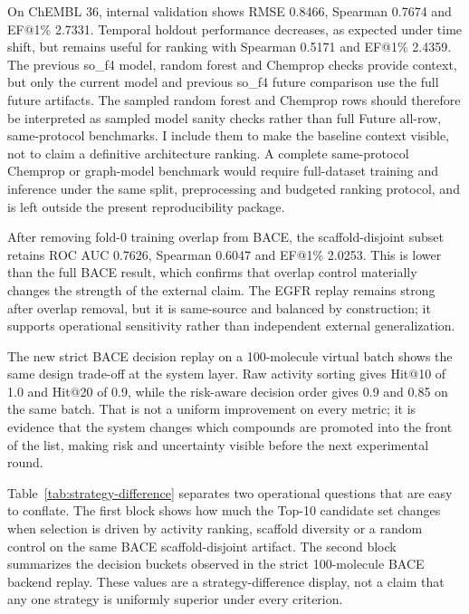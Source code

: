 \documentclass[manuscript=article]{achemso}
\begin{document}
On ChEMBL 36, internal validation shows RMSE 0.8466, Spearman 0.7674 and
EF@1\% 2.7331. Temporal holdout performance decreases, as expected under time
shift, but remains useful for ranking with Spearman 0.5171 and EF@1\% 2.4359.
The previous so\_f4 model, random forest and Chemprop checks provide context,
but only the current model and previous so\_f4 future comparison use the full
future artifacts. The sampled random forest and Chemprop rows should therefore
be interpreted as sampled model sanity checks rather than full Future
all-row, same-protocol benchmarks. I include them to make the baseline context
visible, not to claim a definitive architecture ranking. A complete
same-protocol Chemprop or graph-model benchmark would require full-dataset
training and inference under the same split, preprocessing and budgeted
ranking protocol, and is left outside the present reproducibility package.
\ModelPerformanceTable
\BaselineSanityTable

After removing fold-0 training overlap from BACE, the scaffold-disjoint subset
retains ROC AUC 0.7626, Spearman 0.6047 and EF@1\% 2.0253. This is lower than
the full BACE result, which confirms that overlap control materially changes
the strength of the external claim. The EGFR replay remains strong after
overlap removal, but it is same-source and balanced by construction; it
supports operational sensitivity rather than independent external generalization.
\BaceOverlapTable
\EgfrOverlapTable

The new strict BACE decision replay on a 100-molecule virtual batch shows the
same design trade-off at the system layer. Raw activity sorting gives
Hit@10 of 1.0 and Hit@20 of 0.9, while the risk-aware decision order gives
0.9 and 0.85 on the same batch. That is not a uniform improvement on every
metric; it is evidence that the system changes which compounds are promoted
into the front of the list, making risk and uncertainty visible before the
next experimental round.
\DecisionReplayTable
\FloatBarrier

Table~\ref{tab:strategy-difference} separates two operational questions that
are easy to conflate. The first block shows how much the Top-10 candidate set
changes when selection is driven by activity ranking, scaffold diversity or a
random control on the same BACE scaffold-disjoint artifact. The second block
summarizes the decision buckets observed in the strict 100-molecule BACE
backend replay. These values are a strategy-difference display, not a claim
that any one strategy is uniformly superior under every criterion.
\StrategyDifferenceTable
\FloatBarrier
\end{document}

